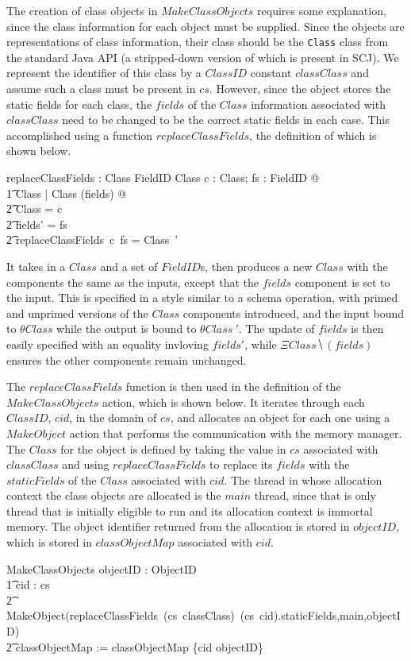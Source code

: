 The creation of class objects in $MakeClassObjects$ requires some
explanation, since the class information for each object must be
supplied.
Since the objects are representations of class information, their
class should be the \texttt{Class} class from the standard Java API (a
stripped-down version of which is present in SCJ).
We represent the identifier of this class by a $ClassID$ constant
$classClass$ and assume such a class must be present in $cs$.
However, since the object stores the static fields for each class, the
$fields$ of the $Class$ information associated with $classClass$ need
to be changed to be the correct static fields in each case.
This accomplished using a function $replaceClassFields$, the
definition of which is shown below.
\begin{axdef}
  replaceClassFields : Class \fun \finset FieldID \fun Class
\where
  \forall c : Class; fs : \finset FieldID @ \\
  \t1 \exists \Delta Class | \Xi Class \hide (fields) @ \\
  \t2 \theta Class = c \land \\
  \t2 fields' = fs \land \\
  \t2 replaceClassFields~c~fs = \theta Class~'
\end{axdef}
It takes in a $Class$ and a set of $FieldID$s, then produces a new
$Class$ with the components the same as the inputs, except that the
$fields$ component is set to the input.
This is specified in a style similar to a schema operation, with
primed and unprimed versions of the $Class$ components introduced, and
the input bound to $\theta Class$ while the output is bound to
$\theta Class~'$.
The update of $fields$ is then easily specified with an equality
invloving $fields'$, while $\Xi Class \hide (fields)$ ensures the
other components remain unchanged.

The $replaceClassFields$ function is then used in the definition of
the $MakeClassObjects$ action, which is shown below.
It iterates through each $ClassID$, $cid$, in the domain of $cs$, and
allocates an object for each one using a $MakeObject$ action that
performs the communication with the memory manager.
The $Class$ for the object is defined by taking the value in $cs$
associated with $classClass$ and using $replaceClassFields$ to replace
its $fields$ with the $staticFields$ of the $Class$ associated with
$cid$.
The thread in whose allocation context the class objects are allocated
is the $main$ thread, since that is only thread that is initially
eligible to run and its allocation context is immortal memory.
The object identifier returned from the allocation is stored in
$objectID$, which is stored in $classObjectMap$ associated with $cid$.
\begin{circusaction}
  MakeClassObjects \circdef \circvar objectID : ObjectID \circspot \\
  \t1 \Semi cid : \dom cs \circspot \\
  \t2 MakeObject(replaceClassFields~(cs~classClass)~(cs~cid).staticFields,main,objectID) \circseq \\
  \t2 classObjectMap := classObjectMap \cup \{cid \mapsto objectID\}
\end{circusaction}

